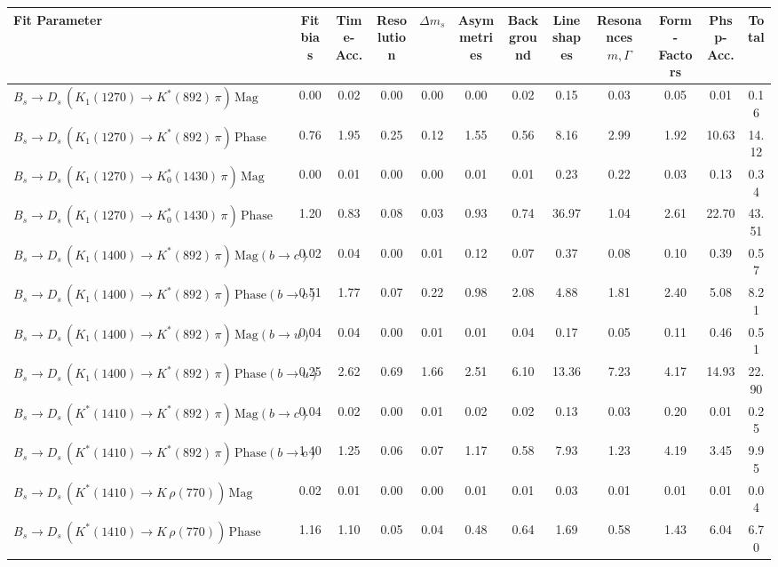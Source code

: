 \begin{tabular}{l  c  c  c  c  c  c  c  c  c  c  | c }
\hline
\hline
Fit Parameter & Fit bias & Time-Acc. & Resolution & $\Delta m_{s}$ & Asymmetries & Background & Lineshapes & Resonances $m,\Gamma$ & Form-Factors & Phsp-Acc. &  Total  \\ 
\hline
$B_s \to D_s \, ( K_1(1270) \to K^{*}(892) \, \pi ) \, \text{Mag}$ & 0.00 & 0.02 & 0.00 & 0.00 & 0.00 & 0.02 & 0.15 & 0.03 & 0.05 & 0.01 & 0.16 \\ 
$B_s \to D_s \, ( K_1(1270) \to K^{*}(892) \, \pi ) \, \text{Phase}$ & 0.76 & 1.95 & 0.25 & 0.12 & 1.55 & 0.56 & 8.16 & 2.99 & 1.92 & 10.63 & 14.12 \\ 
$B_s \to D_s \, ( K_1(1270) \to K^{*}_{0}(1430) \, \pi ) \, \text{Mag} $ & 0.00 & 0.01 & 0.00 & 0.00 & 0.01 & 0.01 & 0.23 & 0.22 & 0.03 & 0.13 & 0.34 \\ 
$B_s \to D_s \, ( K_1(1270) \to K^{*}_{0}(1430) \, \pi ) \, \text{Phase} $ & 1.20 & 0.83 & 0.08 & 0.03 & 0.93 & 0.74 & 36.97 & 1.04 & 2.61 & 22.70 & 43.51 \\ 
$B_s \to D_s \, ( K_1(1400) \to K^{*}(892) \, \pi ) \, \text{Mag} (b \to c)$ & 0.02 & 0.04 & 0.00 & 0.01 & 0.12 & 0.07 & 0.37 & 0.08 & 0.10 & 0.39 & 0.57 \\ 
$B_s \to D_s \, ( K_1(1400) \to K^{*}(892) \, \pi ) \, \text{Phase} (b \to c)$ & 0.51 & 1.77 & 0.07 & 0.22 & 0.98 & 2.08 & 4.88 & 1.81 & 2.40 & 5.08 & 8.21 \\ 
$B_s \to D_s \, ( K_1(1400) \to K^{*}(892) \, \pi ) \, \text{Mag} (b \to u)$ & 0.04 & 0.04 & 0.00 & 0.01 & 0.01 & 0.04 & 0.17 & 0.05 & 0.11 & 0.46 & 0.51 \\ 
$B_s \to D_s \, ( K_1(1400) \to K^{*}(892) \, \pi ) \, \text{Phase} (b \to u)$ & 0.25 & 2.62 & 0.69 & 1.66 & 2.51 & 6.10 & 13.36 & 7.23 & 4.17 & 14.93 & 22.90 \\ 
$B_s \to D_s \, ( K^{*}(1410) \to K^{*}(892) \, \pi ) \, \text{Mag} (b \to c)$ & 0.04 & 0.02 & 0.00 & 0.01 & 0.02 & 0.02 & 0.13 & 0.03 & 0.20 & 0.01 & 0.25 \\ 
$B_s \to D_s \, ( K^{*}(1410) \to K^{*}(892) \, \pi ) \, \text{Phase} (b \to c)$ & 1.40 & 1.25 & 0.06 & 0.07 & 1.17 & 0.58 & 7.93 & 1.23 & 4.19 & 3.45 & 9.95 \\ 
$B_s \to D_s \, ( K^{*}(1410) \to K \, \rho(770) ) \, \text{Mag}$ & 0.02 & 0.01 & 0.00 & 0.00 & 0.01 & 0.01 & 0.03 & 0.01 & 0.01 & 0.01 & 0.04 \\ 
$B_s \to D_s \, ( K^{*}(1410) \to K \, \rho(770) ) \, \text{Phase}$ & 1.16 & 1.10 & 0.05 & 0.04 & 0.48 & 0.64 & 1.69 & 0.58 & 1.43 & 6.04 & 6.70 \\ 

\end{tabular}
